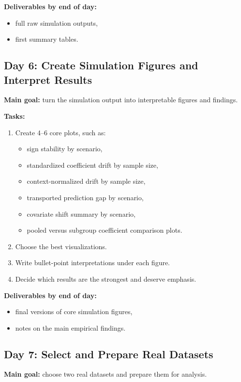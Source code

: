 \documentclass[11pt]{article}
\begin{document}
\textbf{Deliverables by end of day:}
\begin{itemize}
    \item full raw simulation outputs,
    \item first summary tables.
\end{itemize}

\subsection*{Day 6: Create Simulation Figures and Interpret Results}
\textbf{Main goal:} turn the simulation output into interpretable figures and findings.

\textbf{Tasks:}
\begin{enumerate}[label=(\arabic*)]
    \item Create 4--6 core plots, such as:
    \begin{itemize}
        \item sign stability by scenario,
        \item standardized coefficient drift by sample size,
        \item context-normalized drift by sample size,
        \item transported prediction gap by scenario,
        \item covariate shift summary by scenario,
        \item pooled versus subgroup coefficient comparison plots.
    \end{itemize}
    \item Choose the best visualizations.
    \item Write bullet-point interpretations under each figure.
    \item Decide which results are the strongest and deserve emphasis.
\end{enumerate}

\textbf{Deliverables by end of day:}
\begin{itemize}
    \item final versions of core simulation figures,
    \item notes on the main empirical findings.
\end{itemize}

\subsection*{Day 7: Select and Prepare Real Datasets}
\textbf{Main goal:} choose two real datasets and prepare them for analysis.
\end{document}
